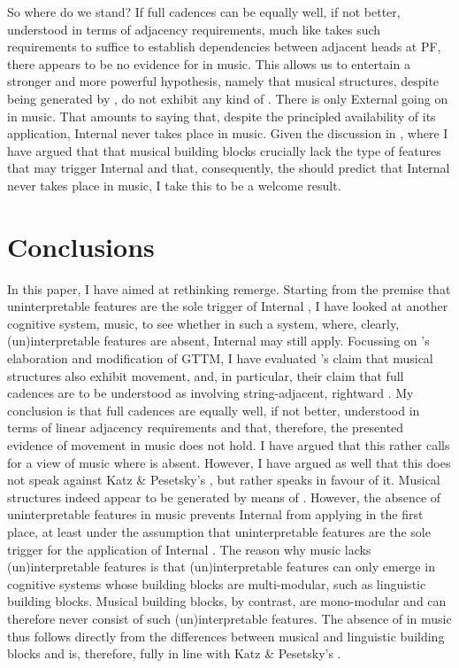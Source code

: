 \documentclass[output=paper]{langsci/langscibook}
\begin{document}
So where do we stand? If full cadences can be equally well, if not better,
understood in terms of adjacency requirements, much like \citet{Bobaljik1995}
takes such requirements to suffice to establish dependencies between adjacent
heads at \gls{PF}, there appears to be no evidence for  in music. This
allows us to entertain a stronger and more powerful hypothesis, namely that
musical structures, despite being generated by , do not exhibit any
kind of . There is only External  going on in music. That
amounts to saying that, despite the principled availability of its application,
Internal  never takes place in music. Given the discussion in
, where I have argued that that musical building blocks
crucially lack the type of features that may trigger Internal  and
that, consequently, the  should
predict that Internal  never takes place in music, I take this to be
a welcome result.

\section{Conclusions}\label{sec:26.5}

In this paper, I have aimed at rethinking remerge. Starting from the premise
that uninterpretable features are the sole trigger of Internal , I
have looked at another cognitive system, music, to see whether in such a
system, where, clearly, (un)interpretable features are absent, Internal
 may still apply. Focussing on \citeauthor{KatzPes2011}’s
elaboration and modification of  \glsdesc{GTTM}, I have
evaluated \citeauthor{KatzPes2011}’s claim that musical structures also exhibit
movement, and, in particular, their claim that full cadences are to be
understood as involving string-adjacent, rightward . My conclusion
is that full cadences are equally well, if not better, understood in terms of
linear adjacency requirements and that, therefore, the presented evidence of
movement in music does not hold. I have argued that this rather calls for a
view of music where  is absent. However, I have argued as well that
this does not speak against Katz \& Pesetsky's , but rather speaks in favour of it. Musical structures
indeed appear to be generated by means of . However, the absence of
uninterpretable features in music prevents Internal  from applying
in the first place, at least under the assumption that uninterpretable features
are the sole trigger for the application of Internal . The reason
why music lacks (un)interpretable features is that (un)interpretable features
can only emerge in cognitive systems whose building blocks are multi-modular,
such as linguistic building blocks. Musical building blocks, by contrast, are
mono-modular and can therefore never consist of such (un)interpretable
features. The absence of  in music thus follows directly from the
differences between musical and linguistic building blocks and is, therefore,
fully in line with Katz \& Pesetsky's .
\end{document}
